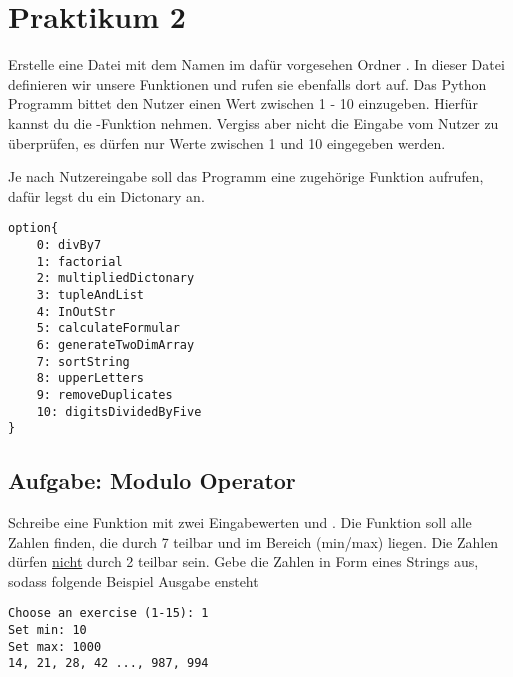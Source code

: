 \chapter{Praktikum 2}
Erstelle eine Datei mit dem Namen  im dafür vorgesehen Ordner . In dieser Datei definieren wir unsere Funktionen und rufen sie ebenfalls dort auf. Das Python Programm bittet den Nutzer einen Wert zwischen 1 - 10 einzugeben. Hierfür kannst du die -Funktion nehmen. Vergiss aber nicht die Eingabe vom Nutzer zu überprüfen, es dürfen nur Werte zwischen 1 und 10 eingegeben werden. 

Je nach Nutzereingabe soll das Programm eine zugehörige Funktion aufrufen, dafür legst du ein Dictonary an.
\begin{lstlisting}
option{
	0: divBy7
	1: factorial
	2: multipliedDictonary
	3: tupleAndList
	4: InOutStr
	5: calculateFormular
	6: generateTwoDimArray
	7: sortString
	8: upperLetters
	9: removeDuplicates
	10: digitsDividedByFive
}
\end{lstlisting} 
\section{Aufgabe: Modulo Operator}
Schreibe eine Funktion mit zwei Eingabewerten  und . Die Funktion soll alle Zahlen finden, die durch 7 teilbar und im Bereich (min/max) liegen. Die Zahlen dürfen \underline{nicht} durch 2 teilbar sein. Gebe die Zahlen in Form eines Strings aus, sodass folgende Beispiel Ausgabe ensteht
\begin{lstlisting}
Choose an exercise (1-15): 1
Set min: 10
Set max: 1000
14, 21, 28, 42 ..., 987, 994
\end{lstlisting}

